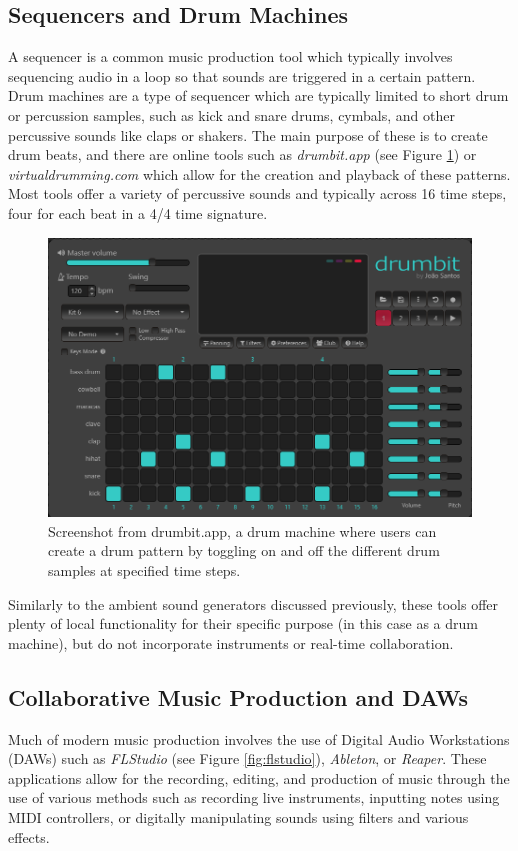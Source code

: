 \subsection{Sequencers and Drum Machines}
A sequencer is a common music production tool which typically involves sequencing audio in a loop so that sounds are triggered in a certain pattern. Drum machines are a type of sequencer which are typically limited to short drum or percussion samples, such as kick and snare drums, cymbals, and other percussive sounds like claps or shakers. The main purpose of these is to create drum beats, and there are online tools such as \textit{drumbit.app} (see Figure \ref{fig:drumbit}) or \textit{virtualdrumming.com} which allow for the creation and playback of these patterns. Most tools offer a variety of percussive sounds and typically across 16 time steps, four for each beat in a 4/4 time signature.

\begin{figure}[htb]
    \centering
    \includegraphics[width=0.5\linewidth]{images/background/drumbit.png}    

    \caption{Screenshot from drumbit.app, a drum machine where users can create a drum pattern by toggling on and off the different drum samples at specified time steps.}

    \label{fig:drumbit}

\end{figure}

Similarly to the ambient sound generators discussed previously, these tools offer plenty of local functionality for their specific purpose (in this case as a drum machine), but do not incorporate instruments or real-time collaboration.

\subsection{Collaborative Music Production and DAWs}
Much of modern music production involves the use of Digital Audio Workstations (DAWs) such as \textit{FLStudio} (see Figure \ref{fig:flstudio}), \textit{Ableton}, or \textit{Reaper}. These applications allow for the recording, editing, and production of music through the use of various methods such as recording live instruments, inputting notes using MIDI controllers, or digitally manipulating sounds using filters and various effects.

